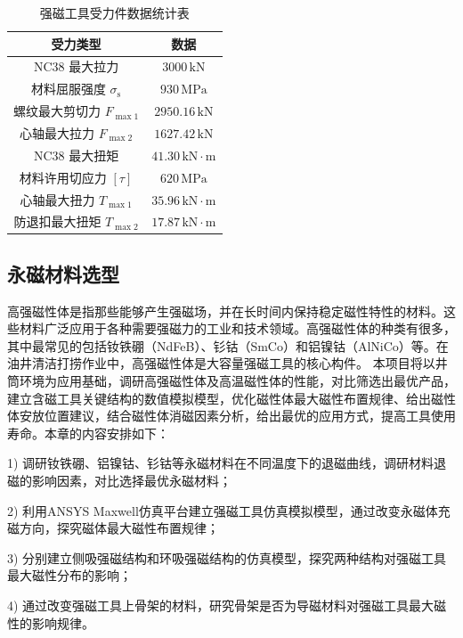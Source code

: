 \begin{table}[htbp]
    \centering
    \caption{强磁工具受力件数据统计表}
    \label{tab:mag_tool_force_data}
    \renewcommand{\arraystretch}{1.5} %
    \begin{tabularx}{.9\textwidth}{CC}
        \toprule
        受力类型 & 数据 \\
        \midrule
        NC38 最大拉力 & $3000\,\text{kN}$ \\
        材料屈服强度 $\sigma_{\mathrm{s}}$ & $930\,\text{MPa}$ \\
        螺纹最大剪切力 $F_{\max1}$ & $2950.16\,\text{kN}$ \\
        心轴最大拉力 $F_{\max2}$ & $1627.42\,\text{kN}$ \\
        NC38 最大扭矩 & $41.30\,\text{kN}\cdot\text{m}$ \\
        材料许用切应力 $[\tau]$ & $620\,\text{MPa}$ \\
        心轴最大扭力 $T_{\max1}$ & $35.96\,\text{kN}\cdot\text{m}$ \\
        防退扣最大扭矩 $T_{\max2}$ & $17.87\,\text{kN}\cdot\text{m}$ \\
        \bottomrule
    \end{tabularx}
\end{table}

\subsection{永磁材料选型}
\label{citimoni}
高强磁性体是指那些能够产生强磁场，并在长时间内保持稳定磁性特性的材料。这些材料广泛应用于各种需要强磁力的工业和技术领域。高强磁性体的种类有很多，其中最常见的包括钕铁硼（NdFeB）、钐钴（SmCo）和铝镍钴（AlNiCo）等。在油井清洁打捞作业中，高强磁性体是大容量强磁工具的核心构件。
本项目将以井筒环境为应用基础，调研高强磁性体及高温磁性体的性能，对比筛选出最优产品，建立含磁工具关键结构的数值模拟模型，优化磁性体最大磁性布置规律、给出磁性体安放位置建议，结合磁性体消磁因素分析，给出最优的应用方式，提高工具使用寿命。本章的内容安排如下：

1) 调研钕铁硼、铝镍钴、钐钴等永磁材料在不同温度下的退磁曲线，调研材料退磁的影响因素，对比选择最优永磁材料；

2) 利用ANSYS Maxwell仿真平台建立强磁工具仿真模拟模型，通过改变永磁体充磁方向，探究磁体最大磁性布置规律；

3) 分别建立侧吸强磁结构和环吸强磁结构的仿真模型，探究两种结构对强磁工具最大磁性分布的影响；

4) 通过改变强磁工具上骨架的材料，研究骨架是否为导磁材料对强磁工具最大磁性的影响规律。


